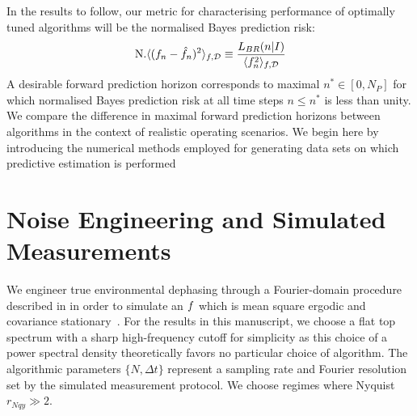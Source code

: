 In the results to follow, our metric for characterising performance of optimally tuned algorithms will be the normalised Bayes prediction risk:
\begin{align}
\text{N.} \langle (f_n - \hat{f}_n)^2 \rangle_{f, \mathcal{D}} \equiv \frac{L_{BR}(n|I)}{\langle f_n^2 \rangle_{f, \mathcal{D}}} 
\end{align}
A desirable forward prediction horizon corresponds to maximal $n^* \in [0, N_P]$ for which normalised Bayes prediction risk at all time steps $n \leq n^*$ is less than unity. We compare the difference in maximal forward prediction horizons between algorithms in the context of realistic operating scenarios.  We begin here by introducing the numerical methods employed for generating data sets on which predictive estimation is performed


\section{Noise Engineering and Simulated Measurements\label{sec:main:NoiseEngineering}}

We engineer true environmental dephasing through a Fourier-domain procedure described in \cite{soare2014} in order to simulate an $f$ which is mean square ergodic and covariance stationary~\cite{gelb1974applied}.  For the results in this manuscript, we choose a flat top spectrum with a sharp high-frequency cutoff for simplicity as this choice of a power spectral density theoretically favors no particular choice of algorithm. The algorithmic parameters $\{N, \Delta t\} $ represent a sampling rate and Fourier resolution set by the simulated measurement protocol. We choose regimes where Nyquist $r_{Nqy} \gg 2$.




